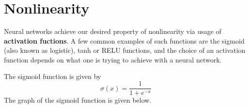 \documentclass[12pt,letterpaper]{book}
\theoremstyle{definition}
\begin{document}
  \section{Nonlinearity}
  Neural networks achieve our desired property of nonlinearity via usage of \textbf{activation fuctions}.
  A few common examples of such functions are the sigmoid (also known as logistic), tanh or RELU functions, and the choice of an activation 
  function depends on what one is trying to achieve with a neural network. 

  The sigmoid function is given by
  \[
      \sigma(x) = \frac{1}{1 + e^{-x}}
  \]
  The graph of the sigmoid function is given below.
  \begin{center}
\end{center}
\end{document}
